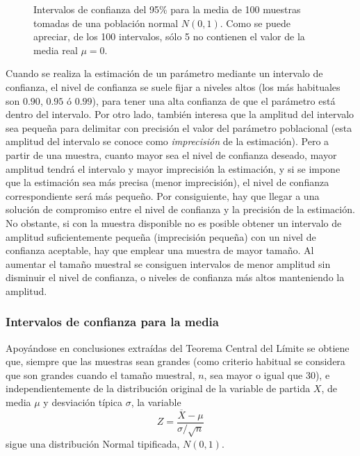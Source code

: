\begin{figure}[h!]
\begin{center}
\scalebox{1}{}
\caption{Intervalos de confianza del 95\% para la media de 100 muestras
tomadas de una población normal $N(0,1)$. Como se puede apreciar, de los 100
intervalos, sólo 5 no contienen el valor de la media real $\mu=0$. }
\label{g:100intervalos}
\end{center}
\end{figure}

Cuando se realiza la estimación de un parámetro mediante un intervalo de confianza, el nivel de confianza se suele fijar
a niveles altos (los más habituales son $0.90$, $0.95$ ó $0.99$), para tener una alta confianza de que el parámetro está
dentro del intervalo. Por otro lado, también interesa que la amplitud del intervalo sea pequeña para delimitar con
precisión el valor del parámetro poblacional (esta amplitud del intervalo se conoce como \emph{imprecisión} de la
estimación). Pero a partir de una muestra, cuanto mayor sea el nivel de confianza deseado, mayor amplitud tendrá el
intervalo y mayor imprecisión la estimación, y si se impone que la estimación sea más precisa (menor imprecisión), el
nivel de confianza correspondiente será más pequeño. Por consiguiente, hay que llegar a una solución de compromiso entre
el nivel de confianza y la precisión de la estimación. No obstante, si con la muestra disponible no es posible obtener un
intervalo de amplitud suficientemente pequeña (imprecisión pequeña) con un nivel de confianza aceptable, hay que emplear
una muestra de mayor tamaño. Al aumentar el tamaño muestral se consiguen intervalos de menor amplitud sin disminuir el
nivel de confianza, o niveles de confianza más altos manteniendo la amplitud.


\subsubsection{Intervalos de confianza para la media}
Apoyándose en conclusiones extraídas del Teorema Central del Límite se obtiene que, siempre que las muestras sean grandes
(como criterio habitual se considera que son grandes cuando el tamaño muestral, $n$, sea mayor o igual que 30), e independientemente de la
distribución original de la variable de partida $X$, de media $\mu$ y desviación típica $\sigma$, la variable \[
Z=\dfrac{\overline{X}-\mu }{\sigma/\sqrt{n}} \] sigue una distribución Normal tipificada, $N(0,1)$.

